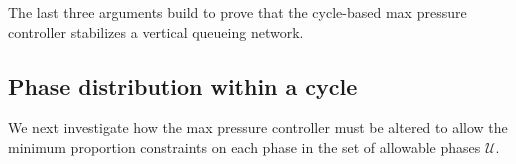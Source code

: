 The last three arguments build to prove that the cycle-based max pressure controller stabilizes a vertical queueing network. 

%



 




\subsection*{Phase distribution within a cycle}
We next investigate how the max pressure controller must be altered to allow the minimum proportion constraints on each phase in the set of allowable phases $\mathcal U$.

